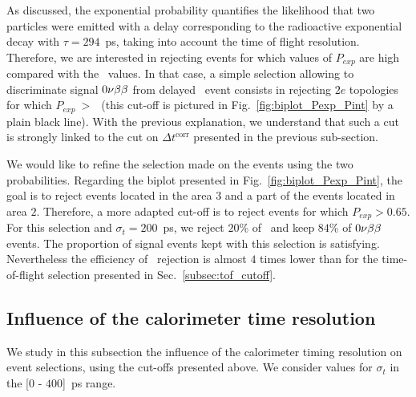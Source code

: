 As discussed, the exponential probability quantifies the likelihood that two particles were emitted with a delay corresponding to the radioactive exponential decay with ${\tau=294}$~ps, taking into account the time of flight resolution.
Therefore, we are interested in rejecting events for which values of $P_{exp}$ are high compared with the \Pint\ values.
In that case, a simple selection allowing to discriminate signal $0\nu\beta\beta$ from delayed \Tl\ event consists in rejecting $2e$ topologies for which $P_{exp}~>~$\Pint\ (this cut-off is pictured in Fig.~\ref{fig:biplot_Pexp_Pint} by a plain black line).
With the previous explanation, we understand that such a cut is strongly linked to the cut on $\Delta t^{\text{corr}}$ presented in the previous sub-section.

We would like to refine the selection made on the events using the two probabilities.
Regarding the biplot presented in Fig.~\ref{fig:biplot_Pexp_Pint}, the goal is to reject events located in the area $3$ and a part of the events located in area $2$.
Therefore, a more adapted cut-off is to reject events for which ${P_{exp}>0.65}$.
For this selection and ${\sigma_{t}=200}$~ps, we reject $20$\% of \Tl\ and keep $84$\% of $0\nu\beta\beta$ events.
The proportion of signal events kept with this selection is satisfying.
Nevertheless the efficiency of \Tl\ rejection is almost $4$ times lower than for the time-of-flight selection presented in Sec.~\ref{subsec:tof_cutoff}.



\subsection{Influence of the calorimeter time resolution}
\label{subsec:calo_sigma}

We study in this subsection the influence of the calorimeter timing resolution on event selections, using the cut-offs presented above.
We consider values for $\sigma_{t}$ in the [$0$ - $400$]~ps range.

